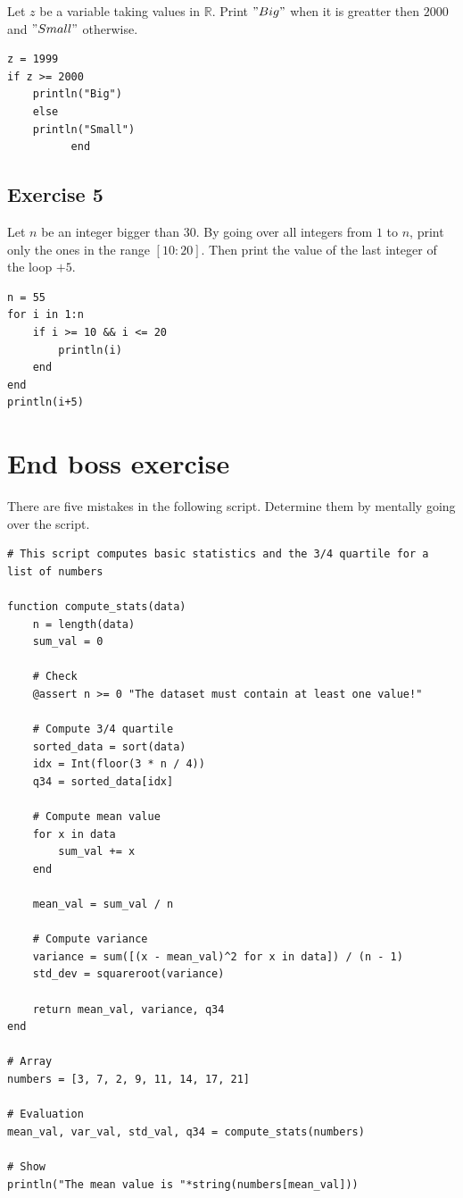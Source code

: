 \documentclass{article}
\begin{document}
Let $z$ be a variable taking values in $\mathbb{R}$. Print $"Big"$ when it is greatter then $2000$ and $"Small"$ otherwise.

\begin{verbatim}
z = 1999
if z >= 2000
    println("Big")
    else
    println("Small")
          end
\end{verbatim}

\subsection*{Exercise 5}

Let $n$ be an integer bigger than $30$. By going over all integers from $1$ to $n$, print only the ones in the range $[10:20]$. Then print the value of the last integer of the loop $+5$.

\begin{verbatim}
n = 55
for i in 1:n
    if i >= 10 && i <= 20
        println(i)
    end
end
println(i+5)
\end{verbatim}

\section*{End boss exercise}

There are five mistakes in the following script. Determine them by mentally going over the script.

\begin{verbatim}
# This script computes basic statistics and the 3/4 quartile for a list of numbers

function compute_stats(data)
    n = length(data)
    sum_val = 0

    # Check
    @assert n >= 0 "The dataset must contain at least one value!"

    # Compute 3/4 quartile
    sorted_data = sort(data)
    idx = Int(floor(3 * n / 4))  
    q34 = sorted_data[idx]      

    # Compute mean value
    for x in data
        sum_val += x
    end

    mean_val = sum_val / n

    # Compute variance
    variance = sum([(x - mean_val)^2 for x in data]) / (n - 1)
    std_dev = squareroot(variance)

    return mean_val, variance, q34
end

# Array
numbers = [3, 7, 2, 9, 11, 14, 17, 21]

# Evaluation
mean_val, var_val, std_val, q34 = compute_stats(numbers)

# Show
println("The mean value is "*string(numbers[mean_val]))

\end{verbatim}
\end{document}
